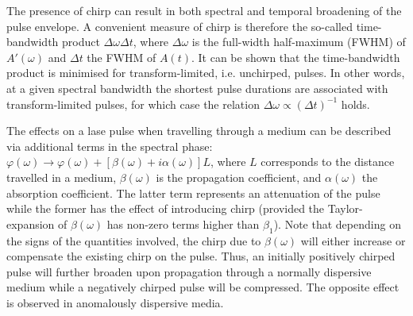 \documentclass[a4paper]{jpconf}
\begin{document}
The presence of chirp can result in both spectral and temporal broadening of the pulse envelope. A convenient measure of chirp is therefore the so-called time-bandwidth product $\Delta \omega \Delta t$, where $\Delta \omega$ is the full-width half-maximum (FWHM) of $A'(\omega)$ and $\Delta t$ the FWHM of $A(t)$. It can be shown that the time-bandwidth product is minimised for transform-limited, i.e. unchirped, pulses. In other words, at a given spectral bandwidth the shortest pulse durations are associated with transform-limited pulses, for which case the relation $\Delta \omega \propto (\Delta t)^{-1}$ holds. \par 
The effects on a lase pulse when travelling through a medium can be described via additional terms in the spectral phase: $\varphi(\omega) \to \varphi(\omega) + [\beta(\omega) + i \alpha(\omega)]L$, where $L$ corresponds to the distance travelled in a medium, $\beta(\omega)$ is the propagation coefficient, and $\alpha(\omega)$ the absorption coefficient. The latter term represents an attenuation of the pulse while the former has the effect of introducing chirp (provided the Taylor-expansion of $\beta(\omega)$ has non-zero terms higher than $\beta_1$). Note that depending on the signs of the quantities involved, the chirp due to $\beta(\omega)$ will either increase or compensate the existing chirp on the pulse. Thus, an initially positively chirped pulse will further broaden upon propagation through a normally dispersive medium while a negatively chirped pulse will be compressed. The opposite effect is observed in anomalously dispersive media.
\end{document}
